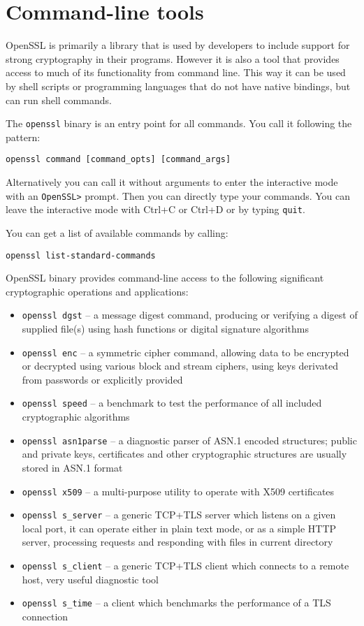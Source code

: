 \section{Command-line tools}

OpenSSL is primarily a library that is used by developers to include support for strong cryptography in their programs. However it is also a tool that provides access to much of its functionality from command line. This way it can be used by shell scripts or programming languages that do not have native bindings, but can run shell commands. \cite{viega2002network}

The \texttt{openssl} binary is an entry point for all commands. You call it following the pattern:

\begin{verbatim}
openssl command [command_opts] [command_args]
\end{verbatim}

Alternatively you can call it without arguments to enter the interactive mode with an \texttt{OpenSSL>} prompt. Then you can directly type your commands. You can leave the interactive mode with Ctrl+C or Ctrl+D or by typing \texttt{quit}.

You can get a list of available commands by calling:

\begin{verbatim}
openssl list-standard-commands
\end{verbatim}

OpenSSL binary provides command-line access to the following significant cryptographic operations and applications:

\begin{itemize}
  \item \texttt{openssl dgst} -- a message digest command, producing or verifying a digest of supplied file(s) using hash functions or digital signature algorithms
  \item \texttt{openssl enc} -- a symmetric cipher command, allowing data to be encrypted or decrypted using various block and stream ciphers, using keys derivated from passwords or explicitly provided
  \item \texttt{openssl speed} -- a benchmark to test the performance of all included cryptographic algorithms
  \item \texttt{openssl asn1parse} -- a diagnostic parser of ASN.1 encoded structures; public and private keys, certificates and other cryptographic structures are usually stored in ASN.1 format
  \item \texttt{openssl x509} -- a multi-purpose utility to operate with X509 certificates
  \item \texttt{openssl s\_server} -- a generic TCP+TLS server which listens on a given local port, it can operate either in plain text mode, or as a simple HTTP server, processing requests and responding with files in current directory
  \item \texttt{openssl s\_client} -- a generic TCP+TLS client which connects to a remote host, very useful diagnostic tool
  \item \texttt{openssl s\_time} -- a client which benchmarks the performance of a TLS connection
\end{itemize}

